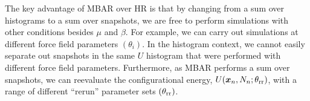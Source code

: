 \documentclass[journal=jced,manuscript=article]{achemso}
\newcommand{\bfv}[1]{{\mbox{\boldmath{$#1$}}}}
\newcommand{\x}{\bfv{x}}
\begin{document}

%
%

The key advantage of MBAR over HR is that by changing from a sum over histograms to a sum over snapshots, we are free to perform simulations with other conditions besides $\mu$ and $\beta$. For example, we can carry out simulations at different force field parameters $(\theta_i)$. In the histogram context, we cannot easily separate out snapshots in the same $U$ histogram that were performed with different force field parameters. Furthermore, as MBAR performs a sum over snapshots, we can reevaluate the configurational energy, $U(\x_{n},N_n;\theta_{\rm rr})$, with a range of different ``rerun'' parameter sets $(\theta_{\rm rr})$.
\end{document}

